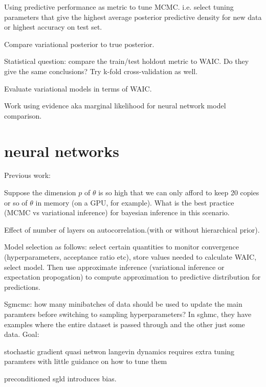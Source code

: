 \documentclass[]{report}
\begin{document}
\begin{enumerate}
Using predictive performance as metric to tune MCMC. i.e. select tuning
parameters that give the highest average posterior predictive density for new
data or highest accuracy on test set.

Compare variational posterior to true posterior.  

Statistical question: compare the train/test holdout metric to WAIC. Do they
give the same conclusions?\cite{kohavi1995study}
Try k-fold cross-validation as well.

Evaluate variational models in terms of WAIC. 

Work using evidence aka marginal likelihood for neural network model comparison. 
\section{ neural networks}
Previous work:\cite{blundell2015weight}

Suppose the dimension $p$ of $\theta$ is so high that we can only afford to keep 20 copies or so of $\theta$ in memory (on a GPU, for example). 
What is the best practice (MCMC vs variational inference) for bayesian inference in this scenario. 

Effect of number of layers on autocorrelation.(with or without hierarchical prior).

Model selection as follows: select certain quantities to monitor convergence (hyperparameters, acceptance ratio etc), store values needed to calculate WAIC, select model. Then use approximate inference (variational inference or expectation propogation) to compute approximation to predictive distribution for predictions.

Sgmcmc: how many minibatches of data should be used to update the main paramters before switching to sampling hyperparameters? In sghmc, they have examples where the entire dataset is passed through and the other just some data.
Goal: 

stochastic gradient quasi netwon langevin dynamics requires extra tuning paramters with little guidance on how to tune them \cite{csimcsekli2016stochastic}

preconditioned sgld introduces bias\cite{li2015preconditioned}.


\end{enumerate}

\end{document}
